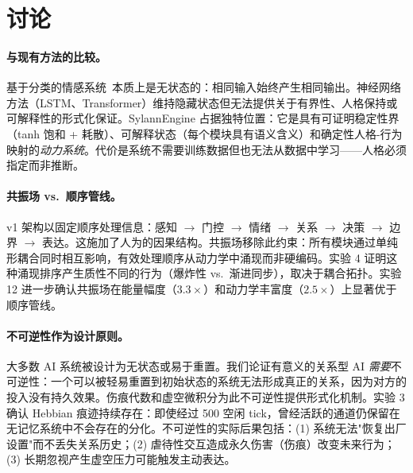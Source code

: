 \documentclass[UTF8,11pt]{ctexart}
\begin{document}
\section{讨论}
\label{sec:discussion}

\paragraph{与现有方法的比较。}基于分类的情感系统~\cite{picard1997,occ1988}本质上是无状态的：相同输入始终产生相同输出。神经网络方法（LSTM、Transformer）维持隐藏状态但无法提供关于有界性、人格保持或可解释性的形式化保证。SylannEngine 占据独特位置：它是具有可证明稳定性界（tanh 饱和 + 耗散）、可解释状态（每个模块具有语义含义）和确定性人格-行为映射的\emph{动力系统}。代价是系统不需要训练数据但也无法从数据中学习——人格必须指定而非推断。

\paragraph{共振场 vs.\ 顺序管线。}v1 架构以固定顺序处理信息：感知 $\to$ 门控 $\to$ 情绪 $\to$ 关系 $\to$ 决策 $\to$ 边界 $\to$ 表达。这施加了人为的因果结构。共振场移除此约束：所有模块通过单纯形耦合同时相互影响，有效处理顺序从动力学中涌现而非硬编码。实验 4 证明这种涌现排序产生质性不同的行为（爆炸性 vs.\ 渐进同步），取决于耦合拓扑。实验 12 进一步确认共振场在能量幅度（$3.3\times$）和动力学丰富度（$2.5\times$）上显著优于顺序管线。

\paragraph{不可逆性作为设计原则。}大多数 AI 系统被设计为无状态或易于重置。我们论证有意义的关系型 AI \emph{需要}不可逆性：一个可以被轻易重置到初始状态的系统无法形成真正的关系，因为对方的投入没有持久效果。伤痕代数和虚空微积分为此不可逆性提供形式化机制。实验 3 确认 Hebbian 痕迹持续存在：即使经过 500 空闲 tick，曾经活跃的通道仍保留在无记忆系统中不会存在的分化。不可逆性的实际后果包括：(1) 系统无法"恢复出厂设置"而不丢失关系历史；(2) 虐待性交互造成永久伤害（伤痕）改变未来行为；(3) 长期忽视产生虚空压力可能触发主动表达。
\end{document}
